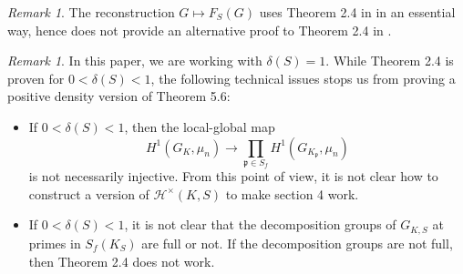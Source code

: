 \documentclass{article}
\theoremstyle{plain}
\theoremstyle{definition}
\theoremstyle{remark}
\newtheorem{rem}[thm]{Remark}
\begin{document}
\begin{rem}
The reconstruction $G \mapsto F_S(G)$ uses Theorem 2.4 in \cite{Shi2} in an essential way, hence does not provide an alternative proof to Theorem 2.4 in \cite{Shi2}.
\end{rem}
\begin{rem}
In this paper, we are working with $\delta(S) = 1$. While Theorem 2.4 is proven for $0 < \delta(S) < 1$, the following technical issues stops us from proving a positive density version of Theorem 5.6: 
\begin{itemize}
    \item If $0<\delta(S)<1$, then the local-global map
    $$
    H^1(G_K,\mu_n) \to \prod_{\mathfrak{p} \in S_f} H^1(G_{K_{\mathfrak{p}}},\mu_n)
    $$
    is not necessarily injective. From this point of view, it is not clear how to construct a version of $\mathcal{H}^{\times}(K,S)$ to make section 4 work.
    \item If $0 <\delta(S)<1$, it is not clear that the decomposition groups of $G_{K,S}$ at primes in $S_f(K_S)$ are full or not. If the decomposition groups are not full, then Theorem 2.4 does not work.
\end{itemize}
\end{rem}


\end{document}
